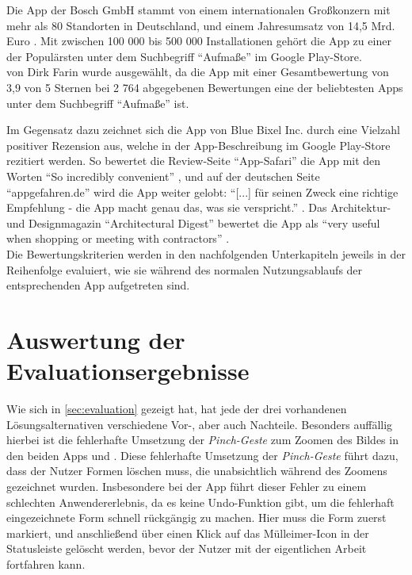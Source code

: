\noindent
Die App \mm{} der Bosch GmbH stammt von einem internationalen Großkonzern mit mehr als 80 Standorten in Deutschland, und einem Jahresumsatz von 14,5 Mrd. Euro \citep{Bosch18}.
Mit zwischen 100 000 bis 500 000 Installationen gehört die App zu einer der Populärsten unter dem Suchbegriff ``Aufmaße'' im Google Play-Store. \\

\im{} von Dirk Farin wurde ausgewählt, da die App mit einer Gesamtbewertung von 3,9 von 5 Sternen bei 2 764 abgegebenen Bewertungen eine der beliebtesten Apps unter dem Suchbegriff ``Aufmaße'' ist.

Im Gegensatz dazu zeichnet sich die App \pm{} von Blue Bixel Inc. durch eine Vielzahl positiver Rezension aus, welche in der App-Beschreibung im Google Play-Store rezitiert werden.
So bewertet die Review-Seite ``App-Safari'' die App mit den Worten ``So incredibly convenient'' \citep{AppSafari18}, und auf der deutschen Seite ``appgefahren.de'' wird die App weiter gelobt:
``[...] für seinen Zweck eine richtige Empfehlung - die App macht genau das, was sie verspricht.'' \citep{Appgefahren18}.
Das Architektur- und Designmagazin ``Architectural Digest'' bewertet die App als ``very useful when shopping or meeting with contractors'' \citep{Architect18}. \\

Die Bewertungskriterien werden in den nachfolgenden Unterkapiteln jeweils in der Reihenfolge evaluiert, wie sie während des normalen Nutzungsablaufs der entsprechenden App aufgetreten sind.




\section{Auswertung der Evaluationsergebnisse}


Wie sich in \autoref{sec:evaluation} gezeigt hat, hat jede der drei vorhandenen Lösungsalternativen verschiedene Vor-, aber auch Nachteile.
Besonders auffällig hierbei ist die fehlerhafte Umsetzung der \emph{Pinch-Geste} zum Zoomen des Bildes in den beiden Apps \mm{} und \pm{}.
Diese fehlerhafte Umsetzung der \emph{Pinch-Geste} führt dazu, dass der Nutzer Formen löschen muss, die unabsichtlich während des Zoomens gezeichnet wurden.
Insbesondere bei der App \pm{} führt dieser Fehler zu einem schlechten Anwendererlebnis, da es keine Undo-Funktion gibt, um die fehlerhaft eingezeichnete Form schnell rückgängig zu machen.
Hier muss die Form zuerst markiert, und anschließend über einen Klick auf das Mülleimer-Icon in der Statusleiste gelöscht werden, bevor der Nutzer mit der eigentlichen Arbeit fortfahren kann. \\

